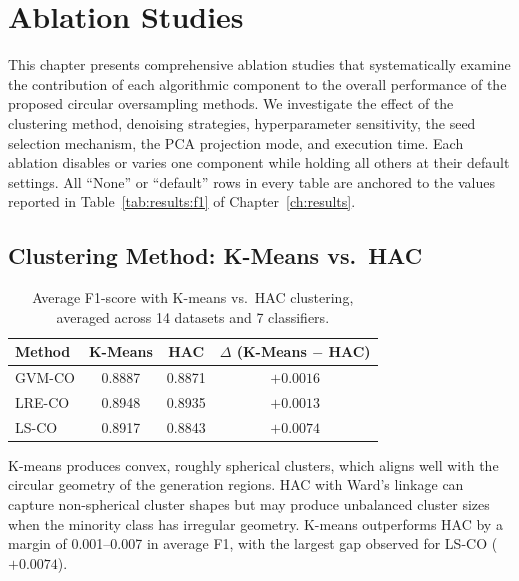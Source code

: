 
\chapter{Ablation Studies}
\label{ch:ablation}

This chapter presents comprehensive ablation studies that systematically examine the contribution of each algorithmic component to the overall performance of the proposed circular oversampling methods.
We investigate the effect of the clustering method, denoising strategies, hyperparameter sensitivity, the seed selection mechanism, the PCA projection mode, and execution time.
Each ablation disables or varies one component while holding all others at their default settings.
All ``None'' or ``default'' rows in every table are anchored to the values reported in Table~\ref{tab:results:f1} of Chapter~\ref{ch:results}.


\section{Clustering Method: K-Means vs.\ HAC}
\label{sec:abl:clustering}

\begin{table}[H]
\centering
\caption{Average F1-score with K-means vs.\ HAC clustering, averaged across 14 datasets and 7 classifiers.}
\label{tab:abl:clustering}
\begin{tabular}{lcc|c}
\toprule
\textbf{Method} & \textbf{K-Means} & \textbf{HAC} & \textbf{$\Delta$ (K-Means $-$ HAC)} \\
\midrule
GVM-CO & 0.8887 & 0.8871 & $+0.0016$ \\
LRE-CO & 0.8948 & 0.8935 & $+0.0013$ \\
LS-CO  & 0.8917 & 0.8843 & $+0.0074$ \\
\bottomrule
\end{tabular}
\end{table}

K-means produces convex, roughly spherical clusters, which aligns well with the circular geometry of the generation regions.
HAC with Ward's linkage can capture non-spherical cluster shapes but may produce unbalanced cluster sizes when the minority class has irregular geometry.
K-means outperforms HAC by a margin of 0.001--0.007 in average F1, with the largest gap observed for LS-CO ($+0.0074$).



